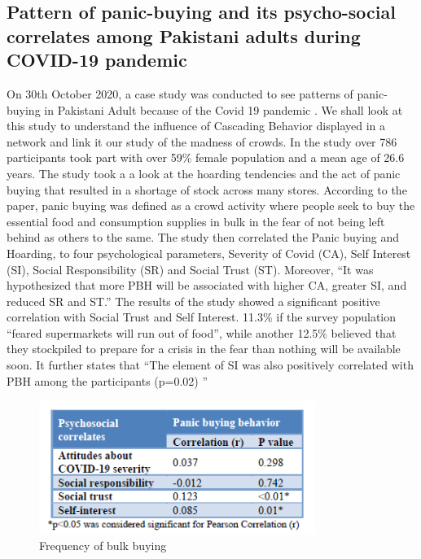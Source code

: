 \documentclass[runningheads]{llncs}
\begin{document}
\subsection{Pattern of panic-buying and its psycho-social correlates among Pakistani adults during COVID-19 pandemic}

On 30th October 2020, a case study was conducted to see patterns of panic-buying in Pakistani Adult because of the Covid 19 pandemic \cite{ref_lncs5}. We shall look at this study to understand the influence of Cascading Behavior displayed in a network and link it our study of the madness of crowds. In the study over 786 participants took part with over 59\% female population and a mean age of 26.6 years. The study took a a look at the hoarding tendencies and the act of panic buying that resulted in a shortage of stock across many stores. According to the paper, panic buying was defined as a crowd activity where people seek to buy the essential food and consumption supplies in bulk in the fear of not being left behind as others to the same. The study then correlated the Panic buying and Hoarding, to four psychological parameters, Severity of Covid (CA), Self Interest (SI), Social Responsibility (SR) and Social Trust (ST). Moreover, “It was hypothesized that more PBH will be associated with higher CA, greater SI, and reduced SR and ST.” The results of the study showed a significant positive correlation with Social Trust and Self Interest. 11.3\% if the survey population “feared supermarkets will run out of food”, while another 12.5\% believed that they stockpiled to prepare for a crisis in the fear than nothing will be available soon. It further states that “The element of SI was also positively correlated with PBH among the participants (p=0.02) \cite{ref_lncs5}”  


\begin{figure}[H]
    \centering
  \includegraphics[width=0.8\textwidth]{Correlation.png}
    \caption{Frequency of bulk buying}
\end{figure}
\end{document}
